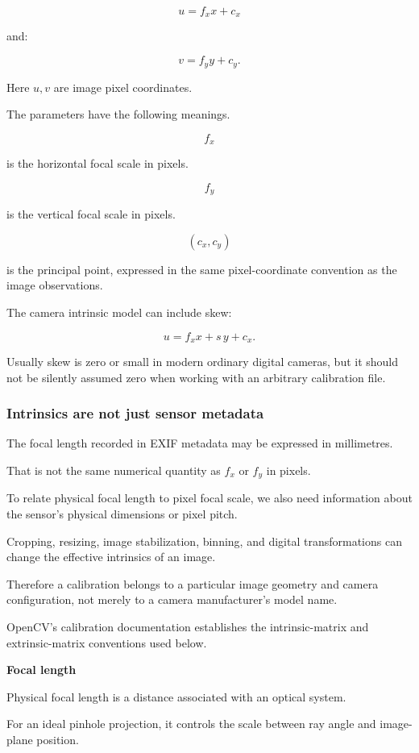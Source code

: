 \[
 \boxed{ u=f_xx+c_x }
\]

and:

\[
 \boxed{ v=f_yy+c_y }.
\]

Here \(u,v\) are image pixel coordinates.

The parameters have the following meanings.

\[
 f_x
\]

is the horizontal focal scale in pixels.

\[
 f_y
\]

is the vertical focal scale in pixels.

\[
 (c_x,c_y)
\]

is the principal point, expressed in the same pixel-coordinate convention as the image observations.

The camera intrinsic model can include skew:

\[
 \boxed{ u=f_xx+s\,y+c_x }.
\]

Usually skew is zero or small in modern ordinary digital cameras, but it should not be silently assumed zero when working with an arbitrary calibration file.

\subsubsection{Intrinsics are not just sensor metadata}\label{intrinsics-are-not-just-sensor-metadata}

The focal length recorded in EXIF metadata may be expressed in millimetres.

That is not the same numerical quantity as \(f_x\) or \(f_y\) in pixels.

To relate physical focal length to pixel focal scale, we also need information about the sensor's physical dimensions or pixel pitch.

Cropping, resizing, image stabilization, binning, and digital transformations can change the effective intrinsics of an image.

Therefore a calibration belongs to a particular image geometry and camera configuration, not merely to a camera manufacturer's model name.

OpenCV's calibration documentation establishes the intrinsic-matrix and extrinsic-matrix conventions used below. 

\textbf{Focal length}

Physical focal length is a distance associated with an optical system.

For an ideal pinhole projection, it controls the scale between ray angle and image-plane position.

